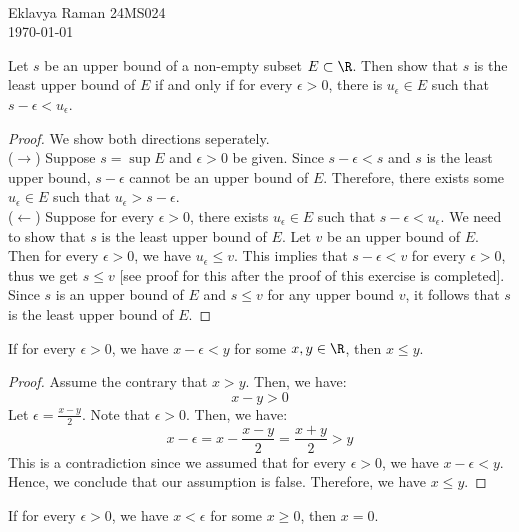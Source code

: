 \documentclass[openany]{book}
\begin{document}
\begin{center}
\LARGE{} \\ \vspace{5pt}
\large{Eklavya Raman 24MS024 \\ \vspace{5pt}}
\today \\ \vspace{5pt}
\end{center}
\begin{exercise}
Let $s$ be an upper bound of a non-empty subset $E \subset \R$. Then show that $s$ is
the least upper bound of $E$ if and only if for every $\epsilon > 0$, there is $u_\epsilon \in E$ such that $s - \epsilon < u_\epsilon$.
\end{exercise}
\begin{proof} We show both directions seperately. \\ 
    ($\rightarrow$) Suppose $s = \sup E$ and $\epsilon > 0$ be given. Since $s - \epsilon < s$ and $s$ is the least upper bound, $s - \epsilon$ cannot be an upper bound of $E$. Therefore, there exists some $u_\epsilon \in E$ such that $u_\epsilon > s - \epsilon$. \\
    ($\leftarrow$) Suppose for every $\epsilon > 0$, there exists $u_\epsilon \in E$ such that $s - \epsilon < u_\epsilon$. We need to show that $s$ is the least upper bound of $E$. Let $v$ be an upper bound of $E$. Then for every $\epsilon > 0$, we have $u_\epsilon \leq v$. This implies that $s - \epsilon < v$ for every $\epsilon > 0$, thus we get $s \leq v$ [see proof for this after the proof of this exercise is completed]. Since $s$ is an upper bound of $E$ and $s \leq v$ for any upper bound $v$, it follows that $s$ is the least upper bound of $E$.
\end{proof}
\begin{mytheorem}
    If for every $\epsilon > 0$, we have $x - \epsilon < y$ for some $x, y \in \R$, then $x \leq y$.
\end{mytheorem}
\begin{proof}
    Assume the contrary that $x > y$. Then, we have:
    $$x - y > 0$$
    Let $\epsilon = \frac{x - y}{2}$. Note that $\epsilon > 0$. Then, we have:
    $$x - \epsilon = x - \frac{x - y}{2} = \frac{x + y}{2} > y$$
    This is a contradiction since we assumed that for every $\epsilon > 0$, we have $x - \epsilon < y$. Hence, we conclude that our assumption is false. Therefore, we have $x \leq y$.
\end{proof}
\begin{corollary}
    If for every $\epsilon > 0$, we have $x < \epsilon$ for some $x \geq 0$, then $x = 0$.
\end{corollary}
\end{document}
